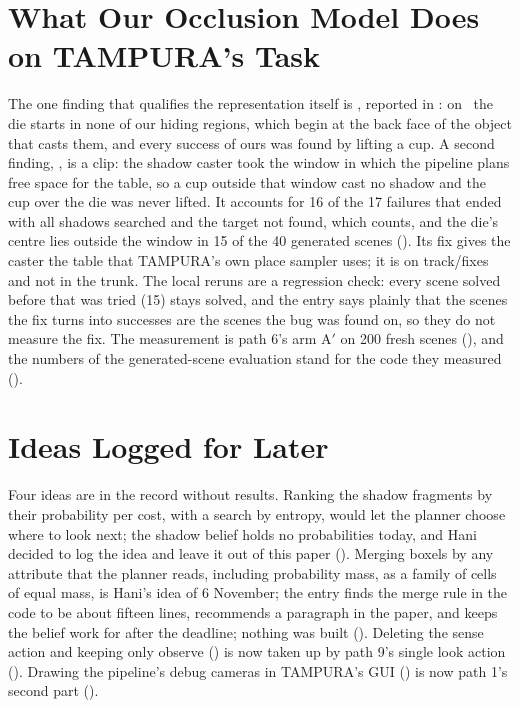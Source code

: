 \section{What Our Occlusion Model Does on TAMPURA's Task}
\label{sec:occlusion-findings}

The one finding that qualifies the representation itself is , reported in
: on \fdice\ the die starts in none of our hiding regions, which
begin at the back face of the object that casts them, and every success of ours was
found by lifting a cup. A second finding, , is a clip: the shadow caster took the
window in which the pipeline plans free space for the table, so a cup outside that
window cast no shadow and the cup over the die was never lifted. It accounts for 16
of the 17 failures that ended with all shadows searched and the target not found,
which  counts, and the die's centre
lies outside the window in 15 of the 40 generated scenes (). Its fix gives
the caster the table that TAMPURA's own place sampler uses; it is on track/fixes
and not in the trunk. The local reruns are a regression check: every scene
solved before that was tried (15) stays solved, and the entry says plainly that
the scenes the fix turns into successes are the scenes the bug was found on, so
they do not measure the fix. The measurement is path 6's arm A$'$ on 200 fresh scenes
(), and the numbers of the generated-scene evaluation stand
for the code they measured ().

\section{Ideas Logged for Later}
\label{sec:ideas}

Four ideas are in the record without results. Ranking the shadow fragments by their
probability per cost, with a search by entropy, would let the planner choose where
to look next; the shadow belief holds no probabilities today, and Hani decided to log
the idea and leave it out of this paper (). Merging boxels by any attribute
that the planner reads, including probability mass, as a family of cells of equal
mass, is Hani's idea of 6 November; the entry finds the merge rule in the code to be
about fifteen lines, recommends a paragraph in the paper, and keeps the belief work
for after the deadline; nothing was built (). Deleting the sense action and
keeping only observe () is now taken up by path 9's single look action
(). Drawing the pipeline's debug cameras in TAMPURA's GUI () is
now path 1's second part ().

